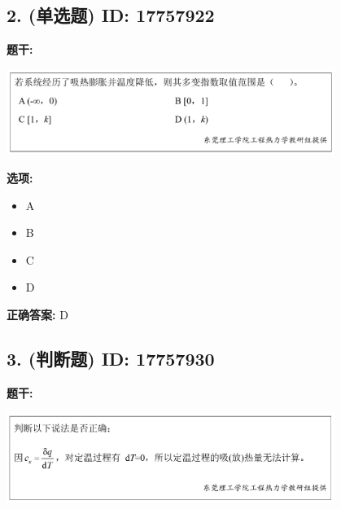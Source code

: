 \documentclass[12pt]{article}
\begin{document}
\vspace{0.5em}\hrulefill\vspace{1em}

\subsection*{2. (单选题) \small ID: 17757922}

\textbf{题干:}


\begin{center}\includegraphics[width=0.8\textwidth, height=0.25\textheight, keepaspectratio]{question_2_17757922/title_img_1.png}\end{center}

\textbf{选项:}
\begin{itemize}[leftmargin=*]
  \item A

  \item B

  \item C

  \item D

\end{itemize}

\textbf{正确答案:}
D

\vspace{0.5em}\hrulefill\vspace{1em}

\subsection*{3. (判断题) \small ID: 17757930}

\textbf{题干:}


\begin{center}\includegraphics[width=0.8\textwidth, height=0.25\textheight, keepaspectratio]{question_3_17757930/title_img_1.png}\end{center}
\end{document}
